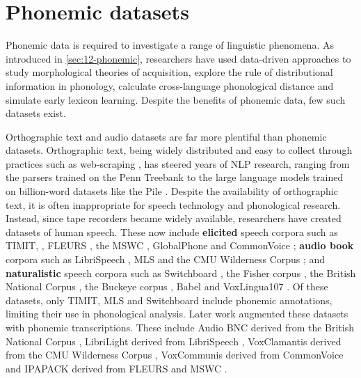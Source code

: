 \section{Phonemic datasets}\label{sec:13-phonemicdatasets}


Phonemic data is required to investigate a range of linguistic phenomena. As introduced in \cref{sec:12-phonemic}, researchers have used data-driven approaches to study morphological theories of acquisition, explore the rule of distributional information in phonology, calculate cross-language phonological distance and simulate early lexicon learning. Despite the benefits of phonemic data, few such datasets exist. 

Orthographic text and audio datasets are far more plentiful than phonemic datasets. Orthographic text, being widely distributed and easy to collect through practices such as web-scraping \citep{bansal-2022-datascaling}, has steered years of NLP research, ranging from the parsers trained on the Penn Treebank \citep{taylor2003penn} to the large language models trained on billion-word datasets like the Pile \citep{pile}. Despite the availability of orthographic text, it is often inappropriate for speech technology and phonological research. Instead, since tape recorders became widely available, researchers have created datasets of human speech. These now include \textbf{elicited} speech corpora such as TIMIT, \citep{garofolo1993darpa}, FLEURS \citep{conneau2023fleurs}, the MSWC \citep{mazumder2021multilingual}, GlobalPhone \citep{schultz2002globalphone} and CommonVoice \citep{ardila-etal-2020-common}; \textbf{audio book} corpora such as LibriSpeech \citep{panayotov2015librispeech}, MLS \citep{pratap2020mls} and the CMU Wilderness Corpus \citep{8683536}; and \textbf{naturalistic} speech corpora such as Switchboard \citep{godfrey1992switchboard}, the Fisher corpus \citep{cieri2004fisher}, the British National Corpus \citep{bnc2007}, the Buckeye corpus \citep{pitt2007buckeye}, Babel \citep{harper2011babel} and VoxLingua107 \citep{9383459}. Of these datasets, only TIMIT, MLS and Switchboard include phonemic annotations, limiting their use in phonological analysis. Later work augmented these datasets with phonemic transcriptions. These include Audio BNC derived from the British National Corpus \citep{coleman2011mining}, LibriLight derived from LibriSpeech \citep{Kahn_2020}, VoxClamantis derived from the CMU Wilderness Corpus \citep{salesky-etal-2020-corpus}, VoxCommunis derived from CommonVoice \citep{ahn-chodroff-2022-voxcommunis} and IPAPACK derived from FLEURS and MSWC \citep{zhu-etal-2024-taste}.

